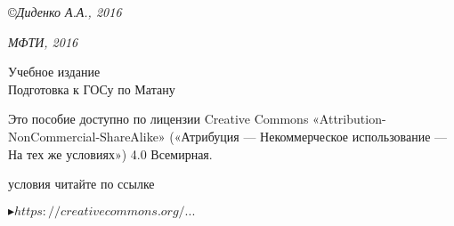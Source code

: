 \medskip

\copyright \textsl{Диденко А.А., 2016}

\medspace

\textsl{МФТИ, 2016}

\vspace*{7\baselineskip}

\center

{\Large Учебное издание}
\\[2\baselineskip]
{\Huge Подготовка к ГОСу по Матану}

\vspace*{\fill}

\noindent
\begin{minipage}[t]{0.61\textwidth}
\quad\small Это пособие доступно по лицензии Creative Commons «Attribution-NonCommercial-ShareAlike» («Атрибуция — Некоммерческое использование — На тех же условиях») 4.0 Всемирная.

 условия читайте по ссылке

\qquad\href{https://creativecommons.org/licenses/by-nc-sa/4.0/deed.ru}{\textcolor{prpl}{$\blacktriangleright https://creativecommons.org/...$}}
\end{minipage}%
\hfill%
\begin{minipage}[t]{\dimexpr(0.39\textwidth-2mm)}
\end{minipage}
